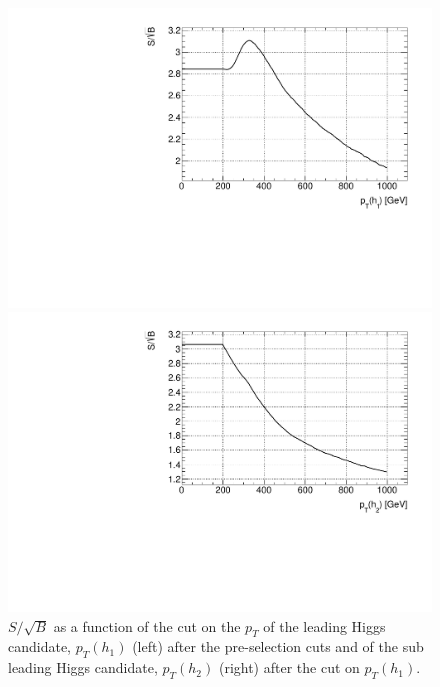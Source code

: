 \begin{figure}
	\centering
	\begin{minipage}{.5\textwidth}
		\centering
		\includegraphics[trim={.6cm 0 0 0},clip,width=\linewidth]{./Figures/SSB_h1_pt.pdf}
	\end{minipage}%
	\begin{minipage}{.5\textwidth}
		\centering
		\includegraphics[trim={0 0 .6cm 0},clip,width=\linewidth]{./Figures/SSB_h2_pt.pdf}
	\end{minipage}
	\label{fig:SSB_h1h2_pt}
	\caption{$S/\sqrt{B}$ as a function of the cut on the $p_T$ of the leading Higgs candidate, $p_T(h_1)$ (left) after the pre-selection cuts and of the sub leading Higgs candidate, $p_T(h_2)$ (right) after the cut on $p_T(h_1)$.}
\end{figure} 

